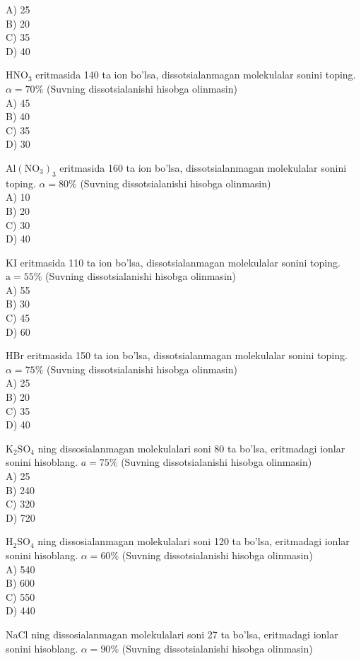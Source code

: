 A) 25\\
B) 20\\
C) 35\\
D) 40
  \item $\mathrm{HNO}_{3}$ eritmasida 140 ta ion bo'lsa, dissotsialanmagan molekulalar sonini toping. $\alpha=70 \%$ (Suvning dissotsialanishi hisobga olinmasin)\\
A) 45\\
B) 40\\
C) 35\\
D) 30
  \item $\mathrm{Al}\left(\mathrm{NO}_{3}\right)_{3}$ eritmasida 160 ta ion bo'lsa, dissotsialanmagan molekulalar sonini toping. $\alpha=80 \%$ (Suvning dissotsialanishi hisobga olinmasin)\\
A) 10\\
B) 20\\
C) 30\\
D) 40
  \item KI eritmasida 110 ta ion bo'lsa, dissotsialanmagan molekulalar sonini toping. $\mathrm{a}=55 \%$ (Suvning dissotsialanishi hisobga olinmasin)\\
A) 55\\
B) 30\\
C) 45\\
D) 60
  \item HBr eritmasida 150 ta ion bo'lsa, dissotsialanmagan molekulalar sonini toping. $\alpha=75 \%$ (Suvning dissotsialanishi hisobga olinmasin)\\
A) 25\\
B) 20\\
C) 35\\
D) 40
  \item $\mathrm{K}_{2} \mathrm{SO}_{4}$ ning dissosialanmagan molekulalari soni 80 ta bo'lsa, eritmadagi ionlar sonini hisoblang. $a=75 \%$ (Suvning dissotsialanishi hisobga olinmasin)\\
A) 25\\
B) 240\\
C) 320\\
D) 720
  \item $\mathrm{H}_{2} \mathrm{SO}_{4}$ ning dissosialanmagan molekulalari soni 120 ta bo'lsa, eritmadagi ionlar sonini hisoblang. $\alpha=60 \%$ (Suvning dissotsialanishi hisobga olinmasin)\\
A) 540\\
B) 600\\
C) 550\\
D) 440
  \item NaCl ning dissosialanmagan molekulalari soni 27 ta bo'lsa, eritmadagi ionlar sonini hisoblang. $\alpha=90 \%$ (Suvning dissotsialanishi hisobga olinmasin)\\
